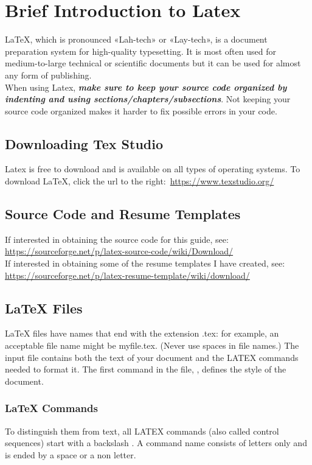 \documentclass[12pt,hidelinks]{article}
\begin{document}
\section{Brief Introduction to Latex}
\vspace{10.5cm}
	LaTeX, which is pronounced «Lah-tech» or «Lay-tech», is a document preparation system for high-quality typesetting. It is most often used for medium-to-large technical or scientific documents but it can be used for almost any form of publishing.\\
	When using Latex, \textbf{\emph{make sure to keep your source code organized by indenting and using sections/chapters/subsections}}. Not keeping your source code organized makes it harder to fix possible errors in your code.
	\subsection{Downloading Tex Studio}
			Latex is free to download and is available on all types of operating systems. To download \LaTeX, click the url to the right:\, \url{https://www.texstudio.org/}
	\subsection{Source Code and Resume Templates}
			If interested in obtaining the source code for this guide, see:\\
			\url{https://sourceforge.net/p/latex-source-code/wiki/Download/}\\
			If interested in obtaining some of the resume templates I have created, see:\\ \url{https://sourceforge.net/p/latex-resume-template/wiki/download/}
	\subsection{LaTeX Files}
			LaTeX files have names that end with the extension .tex: for example, an acceptable file name might be myfile.tex. (Never use spaces in file names.) The input file contains both the text of your document and the LATEX commands needed to format it. The first command in the file, , defines the style of the document.
	\subsubsection{LaTeX Commands}
			To distinguish them from text, all LATEX commands (also called control sequences) start with a backslash \cs. A command name consists of letters only and is ended by a space or a non letter.
\end{document}
